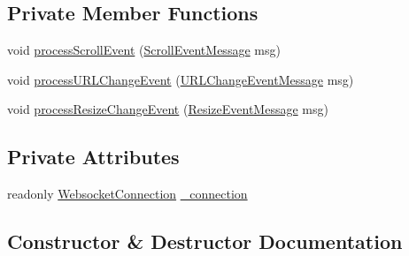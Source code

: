 \subsection*{Private Member Functions}
\begin{DoxyCompactItemize}
\item 
void \hyperlink{class_web_analyzer_1_1_server_1_1_message_handler_1_1_event_message_handler_abae5e602e947dc9b53479678117d5bed}{process\+Scroll\+Event} (\hyperlink{class_web_analyzer_1_1_models_1_1_message_model_1_1_in_1_1_event_messages_1_1_scroll_event_message}{Scroll\+Event\+Message} msg)
\item 
void \hyperlink{class_web_analyzer_1_1_server_1_1_message_handler_1_1_event_message_handler_a30a228c7b5ac5fa51f2b9f81fdd8908c}{process\+U\+R\+L\+Change\+Event} (\hyperlink{class_web_analyzer_1_1_models_1_1_message_model_1_1_in_1_1_event_messages_1_1_u_r_l_change_event_message}{U\+R\+L\+Change\+Event\+Message} msg)
\item 
void \hyperlink{class_web_analyzer_1_1_server_1_1_message_handler_1_1_event_message_handler_aae85692e0e424caf7a57f28c103c1f3f}{process\+Resize\+Change\+Event} (\hyperlink{class_web_analyzer_1_1_models_1_1_message_model_1_1_in_1_1_event_messages_1_1_resize_event_message}{Resize\+Event\+Message} msg)
\end{DoxyCompactItemize}
\subsection*{Private Attributes}
\begin{DoxyCompactItemize}
\item 
readonly \hyperlink{class_web_analyzer_1_1_server_1_1_websocket_connection}{Websocket\+Connection} \hyperlink{class_web_analyzer_1_1_server_1_1_message_handler_1_1_event_message_handler_ab818f2be9cb81fd8854221cc1906d736}{\+\_\+connection}
\end{DoxyCompactItemize}


\subsection{Constructor \& Destructor Documentation}
\hypertarget{class_web_analyzer_1_1_server_1_1_message_handler_1_1_event_message_handler_aad5a6a0c04c3734ed4f4f246429dcc96}{}
